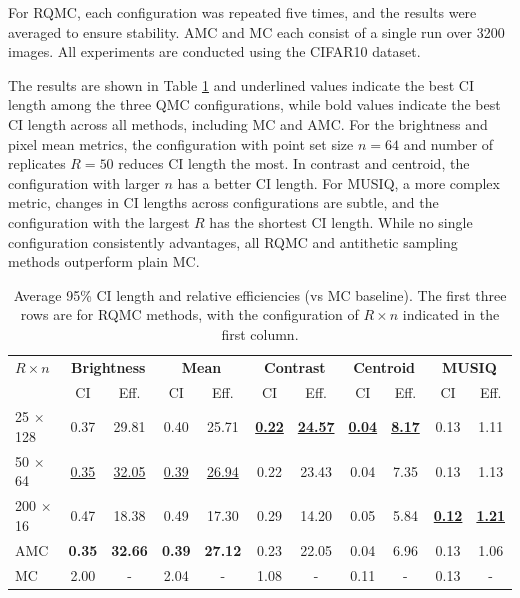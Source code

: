 \documentclass[12pt]{article}
\newcommand{\0}{\mathbf{0}}
\begin{document}
For RQMC, each configuration was repeated five times, and the results were averaged to ensure stability. AMC and MC each consist of a single run over 3200 images. All experiments are conducted using the CIFAR10 dataset. 

The results are shown in Table \ref{tab:qmc_ci_tradeoff} and underlined values indicate the best CI length among the three QMC configurations, while bold values indicate the best CI length across all methods, including MC and AMC. 
For the brightness and pixel mean metrics, the configuration with point set size $n = 64$ and number of replicates $R = 50$ reduces CI length the most. In contrast and centroid, the configuration with larger $n$ has a better CI length. For MUSIQ, a more complex metric, changes in CI lengths across configurations are subtle, and the configuration with the largest $R$ has the shortest CI length. While no single configuration consistently advantages, all RQMC and antithetic sampling methods outperform plain MC.

\begin{table}[htbp!]
\centering
\caption{Average 95\% CI length and relative efficiencies (vs MC baseline). The first three rows are for RQMC methods, with the configuration of $R\times n$ indicated in the first column. }
\label{tab:qmc_ci_tradeoff}
\begin{tabular}{lcccccccccc}
\toprule
\textbf{$R\times n$} & \multicolumn{2}{c}{\textbf{Brightness}} & \multicolumn{2}{c}{\textbf{Mean}} & \multicolumn{2}{c}{\textbf{Contrast}} & \multicolumn{2}{c}{\textbf{Centroid}} & \multicolumn{2}{c}{\textbf{MUSIQ}} \\
 & CI & Eff. & CI & Eff. & CI & Eff. & CI & Eff. & CI & Eff. \\
\midrule
25 $\times$ 128  & 0.37 & 29.81 & 0.40 & 25.71 & \underline{\textbf{0.22}} & \underline{\textbf{24.57}} & \underline{\textbf{0.04}} & \underline{\textbf{8.17}} & 0.13 & 1.11 \\
50 $\times$ 64   & \underline{0.35} & \underline{32.05} & \underline{0.39} & \underline{26.94} & 0.22 & 23.43 & 0.04 & 7.35& 0.13 & 1.13 \\
200 $\times$ 16  & 0.47 & 18.38 & 0.49 & 17.30 & 0.29 & 14.20 & 0.05 & 5.84 & \underline{\textbf{0.12}} & \underline{\textbf{1.21}} \\
AMC              & \textbf{0.35} & \textbf{32.66} & \textbf{0.39} & \textbf{27.12} & 0.23 & 22.05 & 0.04 & 6.96 & 0.13 & 1.06 \\
MC               & 2.00 & -  & 2.04 & -  & 1.08 & -  & 0.11 & - & 0.13 & - \\
\bottomrule
\end{tabular}
\end{table}
\end{document}
